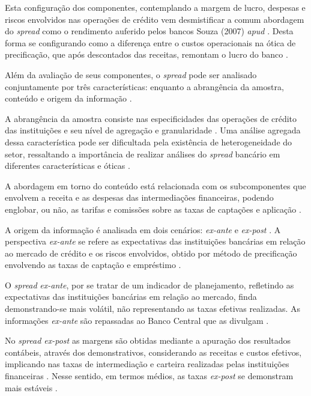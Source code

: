 \documentclass[12pt,openright,oneside,a4paper,chapter=TITLE,section=TITLE,subsection=TITLE,english,french,spanish,portugues,sumario=tradicional]{abntex2}
\begin{document}
Esta configuração dos componentes, contemplando a margem de lucro, despesas e
riscos envolvidos nas operações de crédito vem desmistificar a comum abordagem
do \emph{spread} como o rendimento auferido pelos bancos \cite{costa;nakane:2004}
Souza (2007) \emph{apud} \cite{dantas:2012}. Desta forma se configurando como a
diferença entre o custos operacionais na ótica de precificação, que após
descontados das receitas, remontam o lucro do banco \cite{BCB:2016}.

Além da avaliação de seus componentes, o \emph{spread} pode ser analisado
conjuntamente por três características: enquanto a abrangência da amostra,
conteúdo e origem da informação \cite{leal:2006}.

A abrangência da amostra consiste nas especificidades das operações de crédito
das instituições e seu nível de agregação e granularidade
\cite{costa;nakane:2004}. Uma análise agregada dessa característica pode ser
dificultada pela existência de heterogeneidade do setor, ressaltando a
importância de realizar análises do \emph{spread} bancário em diferentes
características e óticas \cite{block:2000}.

A abordagem em torno do conteúdo está relacionada com os subcomponentes que
envolvem a receita e as despesas das intermediações financeiras, podendo
englobar, ou não, as tarifas e comissões sobre as taxas de captações e
aplicação \cite{block:2000}.

A origem da informação é analisada em dois cenários: \emph{ex-ante} e \emph{ex-post}
\cite{kunt:1999, levine:1997}. A perspectiva \emph{ex-ante} se refere as
expectativas das instituições bancárias em relação ao mercado de crédito e os
riscos envolvidos, obtido por método de precificação envolvendo as taxas de
captação e empréstimo \cite{durigan:2018, leal:2006, dantas:2012}.

O \emph{spread} \emph{ex-ante}, por se tratar de um indicador de planejamento, refletindo
as expectativas das instituições bancárias em relação ao mercado, finda
demonstrando-se mais volátil, não representando as taxas efetivas realizadas.
As informações \emph{ex-ante} são repassadas ao Banco Central que as divulgam
\cite{durigan:2018, leal:2006, dantas:2012}.

No \emph{spread ex-post} as margens são obtidas mediante a apuração dos resultados
contábeis, através dos demonstrativos, considerando as receitas e custos
efetivos, implicando nas taxas de intermediação e carteira realizadas pelas
instituições financeiras \cite{kunt:1999, durigan:2018}. Nesse sentido, em
termos médios, as taxas \emph{ex-post} se demonstram mais estáveis \cite{leal:2006, dantas:2012}.
\end{document}

